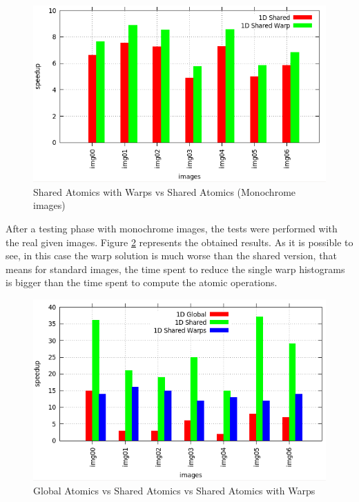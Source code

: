 \documentclass[a4paper]{article}
\begin{document}
\begin{figure}[!ht]
    \centering
    \includegraphics[width=0.7\linewidth]{res/new/histogram_warp}
    \caption{Shared Atomics with Warps vs Shared Atomics (Monochrome images)}
    \label{fig:sawvsa}
\end{figure}
\FloatBarrier

After a testing phase with monochrome images, the tests were performed with the real given images. Figure \ref{fig:gasawvsa} represents the obtained results. As it is possible to see, in this case the warp solution is much worse than the shared version, that means for standard images, the time spent to reduce the single warp histograms is bigger than the time spent to compute the atomic operations. 

\begin{figure}[!ht]
    \centering
    \includegraphics[width=0.7\linewidth]{res/new/histogram_confronto_real}
    \caption{Global Atomics vs Shared Atomics vs Shared Atomics with Warps}
    \label{fig:gasawvsa}
\end{figure}
\FloatBarrier
\end{document}
